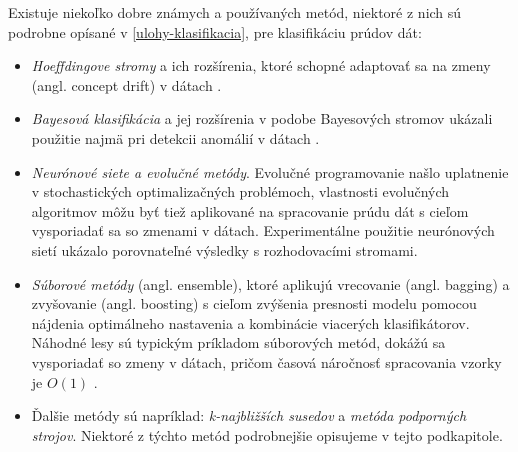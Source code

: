 \par
Existuje niekoľko dobre známych a používaných metód, niektoré z nich sú podrobne opísané v \ref{ulohy-klasifikacia}, pre klasifikáciu prúdov dát:
\begin{itemize}
	\item \textit{Hoeffdingove stromy} a ich rozšírenia, ktoré schopné adaptovať sa na zmeny (angl. concept drift) v dátach \citep{hulten2001mining, bifet2009adaptive}.
	\item \textit{Bayesová klasifikácia} a jej rozšírenia v podobe Bayesových stromov ukázali použitie najmä pri detekcii anomálií v dátach \citep{hill2007real}.
	\item \textit{Neurónové siete a evolučné metódy}. Evolučné programovanie našlo uplatnenie v stochastických optimalizačných problémoch, vlastnosti evolučných algoritmov môžu byť tiež aplikované na spracovanie prúdu dát s cieľom vysporiadať sa so zmenami v dátach. Experimentálne použitie neurónových sietí ukázalo porovnateľné výsledky s rozhodovacími stromami.
	\item \textit{Súborové metódy} (angl. ensemble), ktoré aplikujú vrecovanie (angl. bagging) a zvyšovanie (angl. boosting) s cieľom zvýšenia presnosti modelu pomocou nájdenia optimálneho nastavenia a kombinácie viacerých klasifikátorov. Náhodné lesy sú typickým príkladom súborových metód, dokážú sa vysporiadať so zmeny v dátach, pričom časová náročnosť spracovania vzorky je $O(1)$ \citep{abdulsalam2011classification}.
	\item Ďalšie metódy sú napríklad: \textit{k-najbližších susedov} a \textit{metóda podporných strojov}. Niektoré z týchto metód podrobnejšie opisujeme v tejto podkapitole.
\end{itemize}

